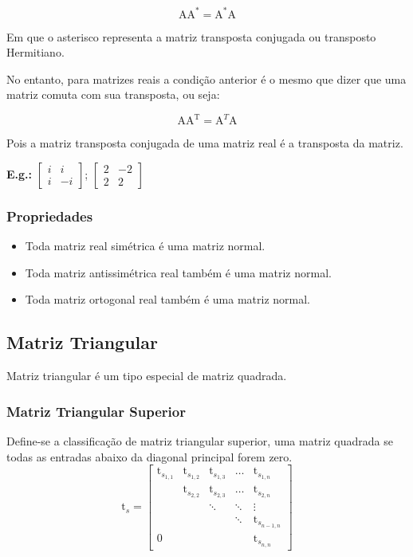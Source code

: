 \documentclass[a4paper,12pt]{article}
\begin{document}
$$ \text{A} \text{A}^* = \text{A}^* \text{A} $$

Em que o asterisco representa a matriz transposta conjugada ou transposto Hermitiano.

No entanto, para matrizes reais a condição anterior é o mesmo que dizer que uma matriz comuta com sua transposta, ou seja:

$$ \text{A} \text{A}^\text{T} = \text{A}^{T} \text{A} $$

Pois a matriz transposta conjugada de uma matriz real é a transposta da matriz.

\textbf{E.g.:} $ \begin{bmatrix}
i & i\\
i & -i
\end{bmatrix} $; $ \begin{bmatrix}
2 & -2\\
2 & 2
\end{bmatrix} $

\subsubsection{Propriedades}

\begin{itemize}

    \item Toda matriz real simétrica é uma matriz normal.
    
    \item Toda matriz antissimétrica real também é uma matriz normal.
    
    \item Toda matriz ortogonal real também é uma matriz normal.

\end{itemize}

\subsection{Matriz Triangular}

Matriz triangular é um tipo especial de matriz quadrada.

\subsubsection{Matriz Triangular Superior}

Define-se a classificação de matriz triangular superior, uma matriz quadrada se todas as entradas abaixo da diagonal principal forem zero.
$$
\text{t}_{s} = \begin{bmatrix}
  \text{t}_{s_{1,1}} & \text{t}_{s_{1,2}} & \text{t}_{s_{1,3}} & \ldots &   \text{t}_{s_{1,n}} \\
          & \text{t}_{s_{2,2}} & \text{t}_{s_{2,3}} & \ldots &   \text{t}_{s_{2,n}} \\
          &         &  \ddots & \ddots &    \vdots \\
          &         &         & \ddots & \text{t}_{s_{n-1,n}} \\
        0 &         &         &        &   \text{t}_{s_{n,n}}
\end{bmatrix}
$$
\end{document}
